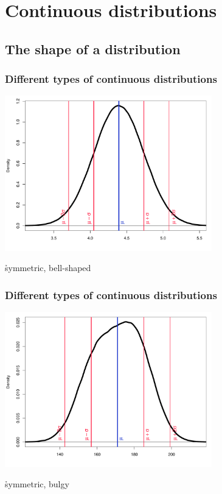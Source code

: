 \documentclass[t]{beamer} %
\begin{document}
\section{Continuous distributions}

\subsection{The shape of a distribution}

\begin{frame}
  \frametitle{Different types of continuous distributions}
  
  \ungap[1]
  \begin{center}
    \includegraphics[width=9cm]{img/disttype_symmetric}

    \ungap[1]
    \h{symmetric, bell-shaped}
  \end{center}
\end{frame}

\begin{frame}
  \frametitle{Different types of continuous distributions}
  
  \ungap[1]
  \begin{center}
    \includegraphics[width=9cm]{img/disttype_bulgy}

    \ungap[1]
    \h{symmetric, bulgy}
  \end{center}
\end{frame}
\end{document}
